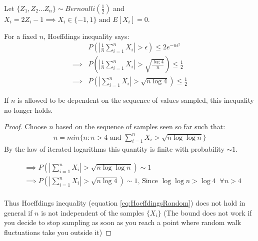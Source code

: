 \documentclass{article}
\newcommand{\eqn}[1]{\begin{align}#1\end{align}}
\newcommand{\eq}[1]{\begin{align*}#1\end{align*}}
\theoremstyle{plain}
\theoremstyle{definition}
\begin{document}
Let $\{Z_1,Z_2...Z_n\} \sim Bernoulli(\frac{1}{2}) $ and $X_i = 2Z_i-1 \implies X_i \in \{-1,1\} \text{ and } E[X_i] = 0$.

For a fixed $n$, Hoeffdings inequality says: 
\eqn{
\label{eq:HoeffdingsRandom}
& P\left(|\frac{1}{n}\sum_{i=1}^{n}X_i| > \epsilon\right) \leq 2e^{-n\epsilon^2} \\
\implies & P \left(|\frac{1}{n}\sum_{i=1}^{n}X_i| > \sqrt{\frac{\log{4}}{n}}\right) \leq \frac{1}{2} \\
\implies & P\left( |\sum_{i=1}^{n}X_i| > \sqrt{n \log{4}}\right) \leq \frac{1}{2}
}


If $n$ is allowed to be dependent on the sequence of values sampled, this inequality no longer holds. 

\begin{proof}
Choose $n$ based on the sequence of samples seen so far such that:
\eq {
n = min \{ n: n > 4 \text{ and } \sum_{i=1}^{n}X_i > \sqrt{n \log \log n}\}
}
By the law of iterated logarithms this quantity is finite with probability $\sim 1$.

\eq {
& \implies  P\left( |\sum_{i=1}^{n}X_i| > \sqrt{n \log{\log{n}}}\right) \sim 1 \\
& \implies  P\left( |\sum_{i=1}^{n}X_i| > \sqrt{n \log{4}}\right) \sim 1 \text{, Since } \log{\log{n}} > \log{4} \;\; \forall n > 4 \\
}
 
Thus Hoeffdings inequality (equation \ref{eq:HoeffdingsRandom}) does not hold in general if $n$ is not independent of the samples $\{X_i\}$ (The bound does not work if you decide to stop sampling as soon as you reach a point where random walk fluctuations take you outside it)



\end{proof}




\end{document}
